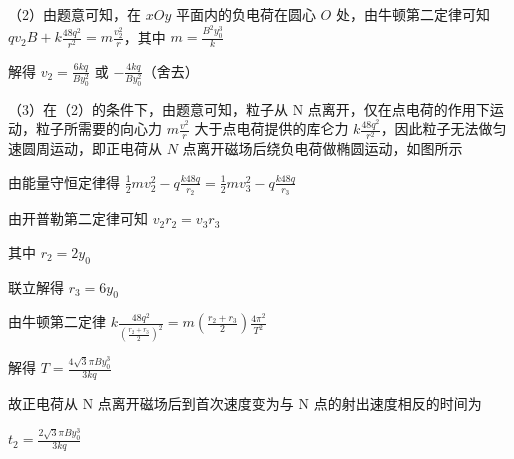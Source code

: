 \documentclass[\gkver]{gaokaozhenti}
\begin{document}
\begin{enumerate}
{（2）由题意可知，在 $xOy$ 平面内的负电荷在圆心 $O$ 处，由牛顿第二定律可知 $qv_{2}B + k\frac{48q^{2}}{r^{2}} = m\frac{v_{2}^{2}}{r}$，其中 $m = \frac{B^{2}y_{0}^{3}}{k}$

解得 $v_{2} = \frac{6kq}{By_{0}^{2}}$ 或 $-\frac{4kq}{By_{0}^{2}}$（舍去）

（3）在（2）的条件下，由题意可知，粒子从 N 点离开，仅在点电荷的作用下运动，粒子所需要的向心力 $m\frac{v^{2}}{r}$ 大于点电荷提供的库仑力 $k\frac{48q^{2}}{r^{2}}$，因此粒子无法做匀速圆周运动，即正电荷从 $N$ 点离开磁场后绕负电荷做椭圆运动，如图所示


由能量守恒定律得 $\frac{1}{2}mv_{2}^{2} - q\frac{k48q}{r_{2}} = \frac{1}{2}mv_{3}^{2} - q\frac{k48q}{r_{3}}$

由开普勒第二定律可知 $v_{2}r_{2} = v_{3}r_{3}$

其中 $r_{2} = 2y_{0}$

联立解得 $r_{3} = 6y_{0}$

由牛顿第二定律 $k\frac{48q^{2}}{\left(\frac{r_{2} + r_{3}}{2}\right)^{2}} = m\left(\frac{r_{2} + r_{3}}{2}\right)\frac{4\pi^{2}}{T^{2}}$

解得 $T = \frac{4\sqrt{3}\pi By_{0}^{3}}{3kq}$

故正电荷从 N 点离开磁场后到首次速度变为与 N 点的射出速度相反的时间为

$t_{2} = \frac{2\sqrt{3}\pi By_{0}^{3}}{3kq}$
}

\end{enumerate}
\end{document}
